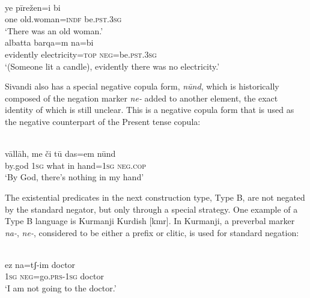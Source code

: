 \documentclass[output=paper]{langsci/langscibook}
\begin{document}
\begin{exe}\ex\label{ex:ieur-sivandi-woman}
\\
    \gll ye    pīrežen=i                 bi \\
one old.woman=\textsc{indf}   be.\textsc{pst.3sg} \\
    \glt `There was an old woman.'
\ex\label{ex:ieur-sivandi-electricity}
\\
    \gll albatta   barqa=m      na=bi \\
evidently   electricity=\textsc{top}   \textsc{neg}=be.\textsc{pst.3sg} \\
    \glt `(Someone lit a candle), evidently there was no electricity.'
    \end{exe}

Sivandi also has a special negative copula form, \textit{nūnd}, which is historically composed of the negation marker \textit{ne-} added to another element, the exact identity of which is still unclear. This is a negative copula form that is used as the negative counterpart of the Present tense copula:

\begin{exe}\ex\label{ex:ieur-sivandi-hand}
\\
    \gll vāllāh, me    či     tū das=em      nūnd \\
by.god  \textsc{1sg}  what in hand=\textsc{1sg}   \textsc{neg.cop} \\
    \glt `By God, there's nothing in my hand'
    \end{exe}

The existential predicates in the next construction type, Type B, are not
negated by the standard negator, but only through a special strategy. One
example of a Type B language is Kurmanji Kurdish [kmr]. In Kurmanji, a
preverbal marker \textit{na-}, \textit{ne-}, considered to be either a
prefix or clitic, is used for standard negation:

\begin{exe}\ex
{}\\  
    \gll ez      na=tʃ-im             doctor \\
\textsc{1sg}   \textsc{neg}=go.\textsc{prs}-\textsc{1sg}    doctor \\
    \glt `I am not going to the doctor.'
    \end{exe}
\end{document}
